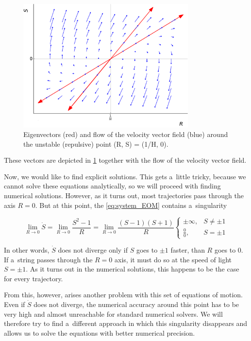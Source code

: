 \begin{figure}
    \centering
    \includegraphics[width = 0.8\textwidth]{Pictures/unstable_node.pdf}
\caption{Eigenvectors (red) and flow of the velocity vector field (blue) around the unstable (repulsive) point (R, S) = (1/H, 0).}
\label{fig:eigvec_repulse}
\end{figure}

\noindent
These vectors are depicted in \cref{fig:eigvec_repulse} together with the flow of the velocity vector field.

Now, we would like to find explicit solutions. This gets a~little tricky, because we cannot solve these equations analytically, so we will proceed with finding numerical solutions. However, as it turns out, most trajectories pass through the axis $R = 0$. But at this point, the \cref{eq:system_EOM} contains a~singularity

\begin{equation}
    \lim\limits_{R \to 0} \dot{S} = \lim\limits_{R \to 0} \frac{S^2 - 1}{R} = \lim\limits_{R \to 0} \frac{(S - 1)(S + 1)}{R}
    \begin{cases}
        \pm \infty, & S \neq \pm 1 \\
        \frac{0}{0}, & S = \pm 1
    \end{cases}
\end{equation}

\noindent
In other words, $\dot{S}$ does not diverge only if $S$ goes to $\pm 1$ faster, than $R$ goes to $0$. If a~string passes through the $R = 0$ axis, it must do so at the speed of light $S = \pm 1$. As it turns out in the numerical solutions, this happens to be the case for every trajectory.

From this, however, arises another problem with this set of equations of motion. Even if $\dot{S}$ does not diverge, the numerical accuracy around this point has to be very high and almost unreachable for standard numerical solvers. We will therefore try to find a~different approach in which this singularity disappears and allows us to solve the equations with better numerical precision.



